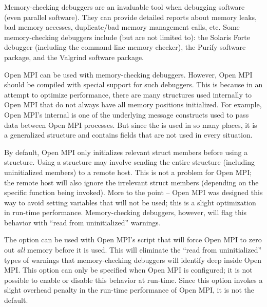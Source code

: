 Memory-checking debuggers are an invaluable tool when debugging
software (even parallel software).  They can provide detailed reports
about memory leaks, bad memory accesses, duplicate/bad memory
management calls, etc.  Some memory-checking debuggers include (but
are not limited to): the Solaris Forte debugger (including the
 command-line memory checker), the Purify software
package, and the Valgrind software package.

Open MPI can be used with memory-checking debuggers.  However, Open
MPI should be compiled with special support for such debuggers.  This
is because in an attempt to optimize performance, there are many
structures used internally to Open MPI that do not always have all
memory positions initialized.  For example, Open MPI's internal
 is one of the underlying message constructs used to
pass data between Open MPI processes.  But since the  is used in so many places, it is a generalized structure and
contains fields that are not used in every situation.

By default, Open MPI only initializes relevant struct members before
using a structure.  Using a structure may involve sending the entire
structure (including uninitialized members) to a remote host.  This is
not a problem for Open MPI; the remote host will also ignore the
irrelevant struct members (depending on the specific function being
invoked).  More to the point -- Open MPI was designed this way to
avoid setting variables that will not be used; this is a slight
optimization in run-time performance.  Memory-checking debuggers,
however, will flag this behavior with ``read from uninitialized''
warnings.

The  option can be used with Open MPI's
 script that will force Open MPI to zero out {\em all}
memory before it is used.  This will eliminate the ``read from
uninitialized'' types of warnings that memory-checking debuggers will
identify deep inside Open MPI.  This option can only be specified when
Open MPI is configured; it is not possible to enable or disable this
behavior at run-time.  Since this option invokes a slight overhead
penalty in the run-time performance of Open MPI, it is not the
default.


